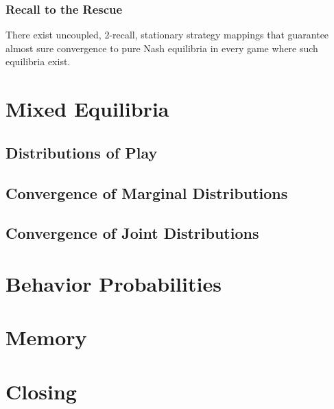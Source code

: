 \documentclass{beamer}
\begin{document}
\begin{frame}
    \frametitle{Recall to the Rescue}
    \begin{theorem}
        There exist uncoupled, 2-recall, stationary strategy mappings that
        guarantee almost sure convergence to
        pure Nash equilibria  in every game where such equilibria exist.
    \end{theorem}
\end{frame}



\section{Mixed Equilibria}
\subsection{Distributions of Play}
\subsection{Convergence of Marginal Distributions}
\subsection{Convergence of Joint Distributions}

\section{Behavior Probabilities}

\section{Memory}

\section{Closing}
 
\end{document}

